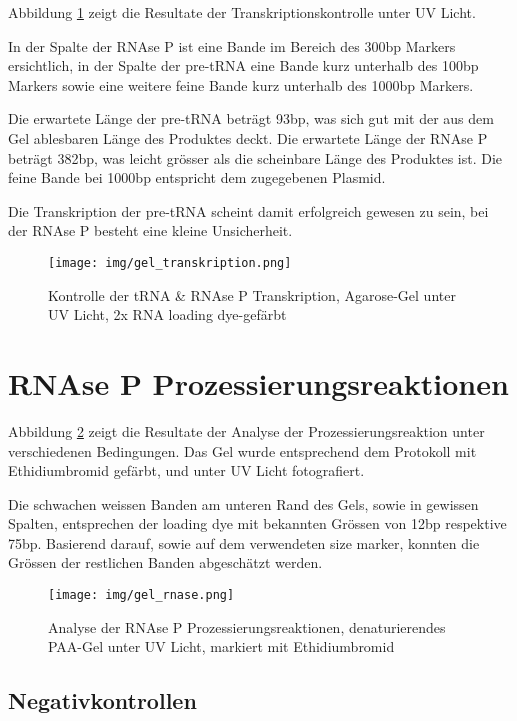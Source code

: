 \documentclass[a4paper,english]{scrreprt}
\begin{document}
Abbildung \ref{fig:transkription_kontrolle} zeigt die Resultate der
Transkriptionskontrolle unter UV Licht. 

In der Spalte der RNAse P ist eine Bande im Bereich des 300bp Markers
ersichtlich, in der Spalte der pre-tRNA eine Bande kurz unterhalb des 100bp
Markers sowie eine weitere feine Bande kurz unterhalb des 1000bp Markers.

Die erwartete Länge der pre-tRNA beträgt 93bp, was sich gut mit der aus dem Gel
ablesbaren Länge des Produktes deckt. Die erwartete Länge der RNAse P beträgt
382bp, was leicht grösser als die scheinbare Länge des Produktes ist. Die feine
Bande bei 1000bp entspricht dem zugegebenen Plasmid.

Die Transkription der pre-tRNA scheint damit erfolgreich gewesen zu sein, bei
der RNAse P besteht eine kleine Unsicherheit.

\begin{figure}[h]
	\centering
	\texttt{[image: img/gel\_transkription.png]}
	\caption{Kontrolle der tRNA \& RNAse P Transkription, Agarose-Gel unter UV Licht, 2x RNA loading dye-gefärbt}
	\label{fig:transkription_kontrolle}
\end{figure}

\section{RNAse P Prozessierungsreaktionen}

Abbildung \ref{fig:rnase_prozessierungsreaktionen} zeigt die Resultate der
Analyse der Prozessierungsreaktion unter verschiedenen Bedingungen. Das Gel
wurde entsprechend dem Protokoll mit Ethidiumbromid gefärbt, und unter UV
Licht fotografiert.

Die schwachen weissen Banden am unteren Rand des Gels, sowie in gewissen
Spalten, entsprechen der loading dye mit bekannten Grössen von 12bp respektive
75bp. Basierend darauf, sowie auf dem verwendeten size marker, konnten die
Grössen der restlichen Banden abgeschätzt werden.

\begin{figure}[h]
	\centering
	\texttt{[image: img/gel\_rnase.png]}
	\caption{Analyse der RNAse P Prozessierungsreaktionen, denaturierendes PAA-Gel unter UV Licht, markiert mit Ethidiumbromid}
	\label{fig:rnase_prozessierungsreaktionen}
\end{figure}


\subsection{Negativkontrollen}
\end{document}
